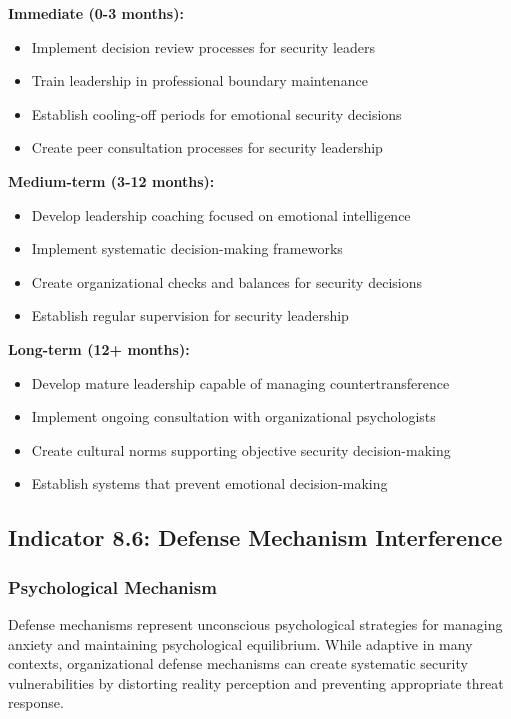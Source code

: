 \documentclass[11pt,a4paper]{article}
\begin{document}
\textbf{Immediate (0-3 months):}
\begin{itemize}
\item Implement decision review processes for security leaders
\item Train leadership in professional boundary maintenance
\item Establish cooling-off periods for emotional security decisions
\item Create peer consultation processes for security leadership
\end{itemize}

\textbf{Medium-term (3-12 months):}
\begin{itemize}
\item Develop leadership coaching focused on emotional intelligence
\item Implement systematic decision-making frameworks
\item Create organizational checks and balances for security decisions
\item Establish regular supervision for security leadership
\end{itemize}

\textbf{Long-term (12+ months):}
\begin{itemize}
\item Develop mature leadership capable of managing countertransference
\item Implement ongoing consultation with organizational psychologists
\item Create cultural norms supporting objective security decision-making
\item Establish systems that prevent emotional decision-making
\end{itemize}

\subsection{Indicator 8.6: Defense Mechanism Interference}

\subsubsection{Psychological Mechanism}

Defense mechanisms represent unconscious psychological strategies for managing anxiety and maintaining psychological equilibrium. While adaptive in many contexts, organizational defense mechanisms can create systematic security vulnerabilities by distorting reality perception and preventing appropriate threat response\cite{vaillant1992}.
\end{document}
